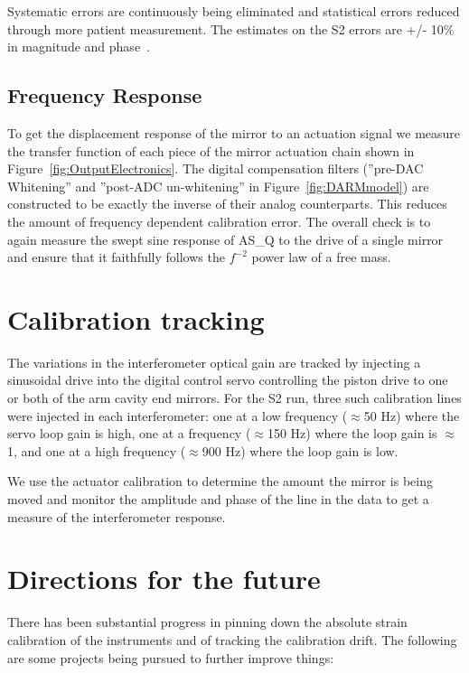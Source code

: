 Systematic errors are continuously being eliminated and statistical errors
reduced through more patient measurement. The estimates on the S2 errors
are +/- 10\% in magnitude and phase~\cite{S2:Calibration}.


\subsection{Frequency Response}
To get the displacement response of the mirror to an actuation signal we measure 
the transfer function of each
piece of the mirror actuation chain shown in Figure~\ref{fig:OutputElectronics}. 
The digital compensation filters (''pre-DAC Whitening'' and 
''post-ADC un-whitening'' in Figure~\ref{fig:DARMmodel}) are constructed to
be exactly the inverse of their analog counterparts. This reduces the amount
of frequency dependent calibration error. The overall check is to again
measure the swept sine response of AS\_Q to the drive of a single mirror and
ensure that it faithfully follows the $f^{-2}$ power law of a free mass.


\section{Calibration tracking}
\label{sec:CalLine}

The variations in the interferometer optical gain are tracked by injecting a sinusoidal
drive into the digital control servo controlling the piston drive to one or both of
the arm cavity end mirrors. For the S2 run, three such calibration lines were injected 
in each interferometer: one at a low frequency ($\approx$50 Hz) where the servo 
loop gain is high, one at a frequency ($\approx$150 Hz) where the loop gain 
is $\approx$1, and one at a high frequency ($\approx$900 Hz) where the 
loop gain is low.

We use the actuator calibration to determine the amount the mirror is being
moved and monitor the amplitude and phase of the line in the data to get a 
measure of the interferometer response.



\section{Directions for the future}

There has been substantial progress in pinning down the absolute strain
calibration of the instruments and of tracking the calibration drift. The
following are some projects being pursued to further improve things:

